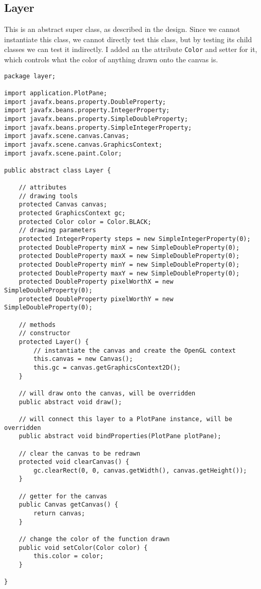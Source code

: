 \documentclass[../../../../main.tex]{subfiles}
\begin{document}
\subsection{Layer}
This is an abstract super class, as described in the design. Since we cannot instantiate this class, we cannot directly test this class, but by testing its child classes we can test it indirectly. I added an the attribute \texttt{Color} and setter for it, which controls what the color of anything drawn onto the canvas is.
\begin{verbatim}
package layer;

import application.PlotPane;
import javafx.beans.property.DoubleProperty;
import javafx.beans.property.IntegerProperty;
import javafx.beans.property.SimpleDoubleProperty;
import javafx.beans.property.SimpleIntegerProperty;
import javafx.scene.canvas.Canvas;
import javafx.scene.canvas.GraphicsContext;
import javafx.scene.paint.Color;

public abstract class Layer {

	// attributes
	// drawing tools
	protected Canvas canvas;
	protected GraphicsContext gc;
	protected Color color = Color.BLACK;
	// drawing parameters
	protected IntegerProperty steps = new SimpleIntegerProperty(0);
	protected DoubleProperty minX = new SimpleDoubleProperty(0);
	protected DoubleProperty maxX = new SimpleDoubleProperty(0);
	protected DoubleProperty minY = new SimpleDoubleProperty(0);
	protected DoubleProperty maxY = new SimpleDoubleProperty(0);
	protected DoubleProperty pixelWorthX = new SimpleDoubleProperty(0);
	protected DoubleProperty pixelWorthY = new SimpleDoubleProperty(0);

	// methods
	// constructor
	protected Layer() {
		// instantiate the canvas and create the OpenGL context
		this.canvas = new Canvas();
		this.gc = canvas.getGraphicsContext2D();
	}

	// will draw onto the canvas, will be overridden
	public abstract void draw();

	// will connect this layer to a PlotPane instance, will be overridden
	public abstract void bindProperties(PlotPane plotPane);

	// clear the canvas to be redrawn
	protected void clearCanvas() {
		gc.clearRect(0, 0, canvas.getWidth(), canvas.getHeight());
	}

	// getter for the canvas
	public Canvas getCanvas() {
		return canvas;
	}

	// change the color of the function drawn
	public void setColor(Color color) {
		this.color = color;
	}

}
\end{verbatim}
\newpage
\end{document}
